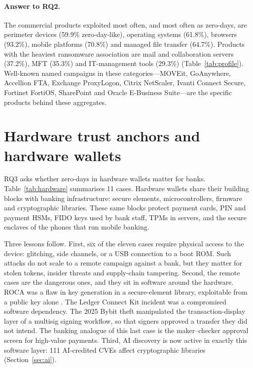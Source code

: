 \begin{table}[!htbp]
\centering
\caption{KEV listings within 180 days per 1,000 CVEs, by publication half-year.}
\label{tab:k180}
\small

\end{table}

\paragraph{Answer to RQ2.} The commercial products exploited most often, and most often as zero-days, are perimeter devices (59.9\% zero-day-like), operating systems (61.8\%), browsers (93.2\%), mobile platforms (70.8\%) and managed file transfer (64.7\%). Products with the heaviest ransomware association are mail and collaboration servers (37.2\%), MFT (35.3\%) and IT-management tools (29.3\%) (Table~\ref{tab:profile}). Well-known named campaigns in these categories---MOVEit, GoAnywhere, Accellion FTA, Exchange ProxyLogon, Citrix NetScaler, Ivanti Connect Secure, Fortinet FortiOS, SharePoint and Oracle E-Business Suite---are the specific products behind these aggregates.

\section{Hardware trust anchors and hardware wallets}\label{sec:hardware}

RQ3 asks whether zero-days in hardware wallets matter for banks. Table~\ref{tab:hardware} summarises 11 cases. Hardware wallets share their building blocks with banking infrastructure: secure elements, microcontrollers, firmware and cryptographic libraries. These same blocks protect payment cards, PIN and payment HSMs, FIDO keys used by bank staff, TPMs in servers, and the secure enclaves of the phones that run mobile banking.

\begin{table}[!htbp]
\centering
\caption{Hardware trust-anchor cases and their banking analogues (author-coded from public research and reporting).}
\label{tab:hardware}
\scriptsize

\end{table}

Three lessons follow. First, six of the eleven cases require physical access to the device: glitching, side channels, or a USB connection to a boot ROM. Such attacks do not scale to a remote campaign against a bank, but they matter for stolen tokens, insider threats and supply-chain tampering. Second, the remote cases are the dangerous ones, and they sit in software around the hardware. ROCA was a flaw in key generation in a secure-element library, exploitable from a public key alone \citep{nemec2017roca}. The Ledger Connect Kit incident was a compromised software dependency. The 2025 Bybit theft manipulated the transaction-display layer of a multisig signing workflow, so that signers approved a transfer they did not intend. The banking analogue of this last case is the maker--checker approval screen for high-value payments. Third, AI discovery is now active in exactly this software layer: 111 AI-credited CVEs affect cryptographic libraries (Section~\ref{sec:ai}).

